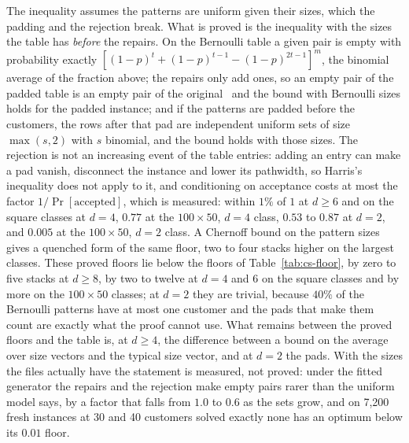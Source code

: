 \begin{table}[htbp]
\centering
\caption{The Chu \& Stuckey classes: mean certified optimum of the five
instances, and the floor from the first-moment inequality at confidence
$0.01$, computed from the pattern sizes of each file. No certified optimum
lies below its floor.}
\label{tab:cs-floor}
\small

\end{table}

The inequality assumes the patterns are uniform given their sizes, which the
padding and the rejection break. What is proved is the inequality with the
sizes the table has \emph{before} the repairs. On the Bernoulli table a given
pair is empty with probability exactly
$[(1-p)^t+(1-p)^{t-1}-(1-p)^{2t-1}]^m$, the binomial average of the fraction
above; the repairs only add ones, so an empty pair of the padded table is an
empty pair of the original~ and the bound with Bernoulli
sizes holds for the padded instance; and if the patterns are padded before the customers, the
rows after that pad are independent uniform sets of size $\max(s,2)$ with $s$
binomial, and the bound holds with those sizes. The rejection is not an
increasing event of the table entries: adding an entry can make a pad vanish,
disconnect the instance and lower its pathwidth, so Harris's inequality does
not apply to it, and conditioning on acceptance costs at most the factor
$1/\Pr[\text{accepted}]$, which is measured: within $1\%$ of $1$ at
$d\ge6$ and on the square classes at $d=4$, $0.77$ at the $100\times50$,
$d=4$ class, $0.53$ to $0.87$ at $d=2$, and $0.005$ at the $100\times50$,
$d=2$ class. A Chernoff bound on the pattern sizes gives a quenched form of
the same floor, two to four stacks higher on the largest classes. These
proved floors lie below the floors of Table~\ref{tab:cs-floor}, by zero to
five stacks at $d\ge8$, by two to twelve at $d=4$ and $6$ on the square
classes and by more on the $100\times50$ classes; at $d=2$ they are trivial,
because $40\%$ of the Bernoulli patterns have at most one customer and the
pads that make them count are exactly what the proof cannot use. What
remains between the proved floors and the table is, at $d\ge4$, the
difference between a bound on the average over size vectors and the typical
size vector, and at $d=2$ the pads. With the sizes the files actually have
the statement is measured, not proved: under the fitted generator the repairs and the
rejection make empty pairs rarer than the uniform model says, by a factor
that falls from $1.0$ to $0.6$ as the sets grow, and on 7{,}200 fresh
instances at 30 and 40 customers solved exactly none has an optimum below its
$0.01$ floor.


